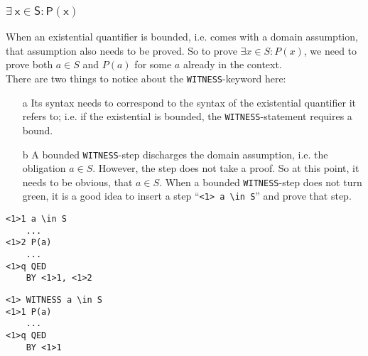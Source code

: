 \documentclass{article}
\newcommand{\code}[1]{\mathsf{#1}}
\begin{document}
\subsubsection{$\code{\exists\ x \in S : P(x)}$}
\vspace{10pt}
\begin{minipage}{230pt}
When an existential quantifier is bounded, i.e. comes with a domain
assumption, that assumption also needs to be proved. So to prove
$\exists x \in S : P(x)$, we need to prove both $a \in S$ and
$P(a)$ for some $a$ already in the context.\\

\vspace{5pt}
There are two things to notice about the \verb|WITNESS|-keyword here:
\begin{itemize}
  \item[a] Its syntax needs to correspond to the syntax of the
    existential quantifier it refers to; i.e. if the existential 
    is bounded, the \verb|WITNESS|-statement requires a bound.
    
  \item[b] A bounded \verb|WITNESS|-step discharges the domain
    assumption, i.e. the obligation $a \in S$. However, the step does
    not take a proof. So at this point, it needs to be obvious, that
    $a \in S$.  When a bounded \verb|WITNESS|-step does not turn
    green, it is a good idea to insert a step ``\verb|<1> a \in S|''
    and prove that step.
\end{itemize}

\end{minipage}
%
\hspace{15pt} \vline \hspace{15pt}
%
\begin{minipage}{80pt}
\begin{verbatim}
<1>1 a \in S
    ...
<1>2 P(a)
    ...
<1>q QED
    BY <1>1, <1>2
\end{verbatim}
\end{minipage}
\hspace{25pt} \vline \hspace{15pt}
\begin{minipage}{80pt}
\begin{verbatim}
<1> WITNESS a \in S
<1>1 P(a)
    ...
<1>q QED
    BY <1>1
\end{verbatim}
\vspace{5pt}
\end{minipage}
\end{document}
